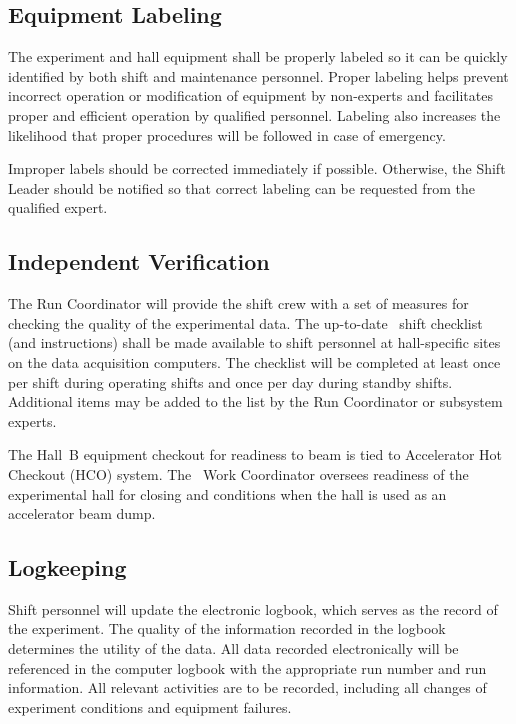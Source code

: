 \documentclass[11pt]{article}
\begin{document}
\subsection{Equipment Labeling}
\indent

The experiment and hall equipment shall be properly labeled so 
it can be quickly identified by both shift and maintenance personnel.
Proper labeling helps prevent incorrect operation or modification of
equipment by non-experts and facilitates proper and efficient operation by
qualified personnel. Labeling also increases the likelihood that 
proper procedures will be followed in case of emergency.

Improper labels should be corrected immediately if possible.
Otherwise, the Shift Leader should be notified so that correct 
labeling can be requested from the qualified expert.


\subsection{Independent Verification}
\indent
	
The Run Coordinator will provide the shift crew with a set of 
measures for checking the quality of the experimental data.  
The up-to-date \HALL\ shift 
checklist (and instructions) shall be made available to shift personnel
at hall-specific sites on the data acquisition  computers.
The checklist will be completed at least once per shift during operating 
shifts and once per day during standby shifts. Additional items may be 
added to the list by the Run Coordinator or subsystem experts.

The Hall~B equipment checkout for readiness to beam
is tied to Accelerator Hot Checkout (HCO) system. 
The \HALL\ Work Coordinator oversees readiness of the experimental hall for closing and 
conditions when the hall is used as an accelerator beam dump. 

\subsection{Logkeeping}
\indent

Shift personnel will update the electronic
logbook, which serves as the record of the experiment. 
The quality of the information recorded in the logbook 
determines the utility of the data.
All data recorded electronically
will be referenced in the  computer 
logbook with the appropriate run number and run information. All 
relevant activities are to be recorded, including 
all changes of experiment conditions and equipment failures.
\end{document}
